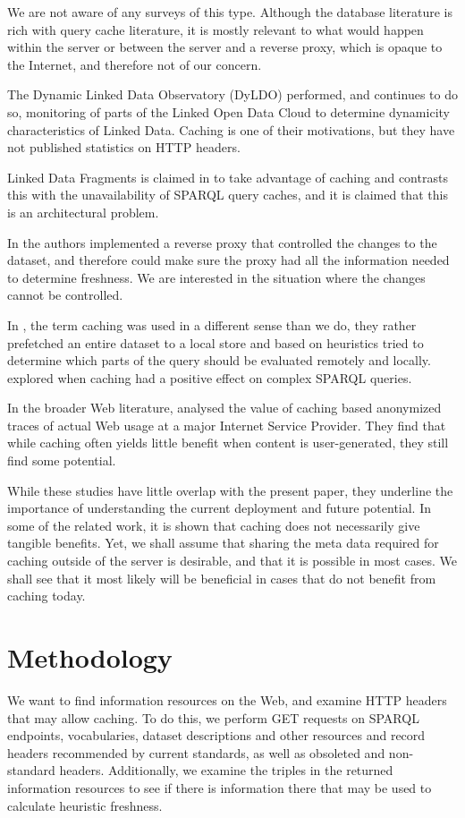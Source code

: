 \documentclass{llncs}
\begin{document}
We are not aware of any surveys of this type. Although the database
literature is rich with query cache literature, it is mostly relevant
to what would happen within the server or between the server and a
reverse proxy, which is opaque to the Internet, and therefore not of
our concern.

The \cite{dyldo2} Dynamic Linked Data Observatory (DyLDO) performed,
and continues to do so, monitoring of parts of the Linked Open Data
Cloud to determine dynamicity characteristics of Linked Data. Caching
is one of their motivations, but they have not published statistics on
HTTP headers.

Linked Data Fragments is claimed in \cite{ldf1} to take advantage of
caching and contrasts this with the unavailability of SPARQL query
caches, and it is claimed that this is an architectural problem.

In \cite{sparqlproxy} the authors implemented a reverse proxy that
controlled the changes to the dataset, and therefore could make sure
the proxy had all the information needed to determine freshness. We
are interested in the situation where the changes cannot be
controlled.

In \cite{umbrich2012hybrid}, the term caching was used in a different
sense than we do, they rather prefetched an entire dataset to a local
store and based on heuristics tried to determine which parts of the
query should be evaluated remotely and locally. \cite{lampo2011cache}
explored when caching had a positive effect on complex SPARQL
queries.

In the broader Web literature, \cite{ager2010revisiting} analysed the
value of caching based anonymized traces of actual Web usage at a
major Internet Service Provider. They find that while caching often
yields little benefit when content is user-generated, they still find
some potential.

While these studies have little overlap with the present paper, they
underline the importance of understanding the current deployment and
future potential. In some of the related work, it is shown that
caching does not necessarily give tangible benefits. Yet, we shall
assume that sharing the meta data required for caching outside of the
server is desirable, and that it is possible in most cases. We shall
see that it most likely will be beneficial in cases that do not
benefit from caching today.

\section{Methodology}
We want to find information resources on the Web, and examine HTTP
headers that may allow caching. To do this, we perform GET requests on
SPARQL endpoints, vocabularies, dataset descriptions and other
resources and record headers recommended by current standards, as well
as obsoleted and non-standard headers. Additionally, we examine the
triples in the returned information resources to see if there is
information there that may be used to calculate heuristic freshness.
\end{document}
